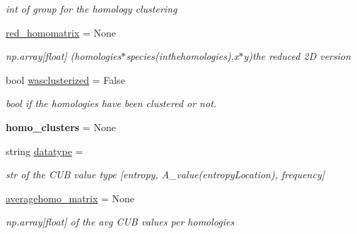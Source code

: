 \begin{DoxyCompactItemize}
\begin{DoxyCompactList}\small\item\em int of group for the homology clustering \end{DoxyCompactList}\item 
\mbox{\label{class_py_c_u_b_1_1homoset_1_1_homo_set_abead19765d92567bdc6d8d2892b72436}} 
\mbox{\hyperlink{class_py_c_u_b_1_1homoset_1_1_homo_set_abead19765d92567bdc6d8d2892b72436}{red\+\_\+homomatrix}} = None
\begin{DoxyCompactList}\small\item\em np.\+array\mbox{[}float\mbox{]} (homologies$\ast$species(inthehomologies),x$\ast$y)the reduced 2D version \end{DoxyCompactList}\item 
bool \mbox{\hyperlink{class_py_c_u_b_1_1homoset_1_1_homo_set_ade27fdf472815f4fb2eb1d1ef552ad42}{wasclusterized}} = False
\begin{DoxyCompactList}\small\item\em bool if the homologies have been clustered or not. \end{DoxyCompactList}\item 
\mbox{\label{class_py_c_u_b_1_1homoset_1_1_homo_set_a5e37288c128509ca765ac3dfa40d24bc}} 
{\bfseries homo\+\_\+clusters} = None
\item 
\mbox{\label{class_py_c_u_b_1_1homoset_1_1_homo_set_a7b5672c7d4faf1bec55d7afffc13ff2a}} 
string \mbox{\hyperlink{class_py_c_u_b_1_1homoset_1_1_homo_set_a7b5672c7d4faf1bec55d7afffc13ff2a}{datatype}} = \textquotesingle{}\textquotesingle{}
\begin{DoxyCompactList}\small\item\em str of the C\+UB value type \mbox{[}entropy, A\+\_\+value(entropy\+Location), frequency\mbox{]} \end{DoxyCompactList}\item 
\mbox{\label{class_py_c_u_b_1_1homoset_1_1_homo_set_a8cb746f5ac4c3fb02bdfa1d7dc996727}} 
\mbox{\hyperlink{class_py_c_u_b_1_1homoset_1_1_homo_set_a8cb746f5ac4c3fb02bdfa1d7dc996727}{averagehomo\+\_\+matrix}} = None
\begin{DoxyCompactList}\small\item\em np.\+array\mbox{[}float\mbox{]} of the avg C\+UB values per homologies \end{DoxyCompactList}\item 

\end{DoxyCompactItemize}

